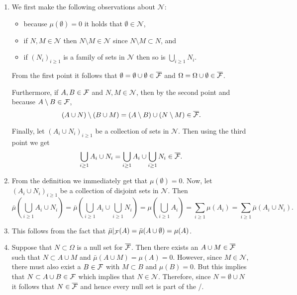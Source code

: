 \begin{enumerate}[label=(\alph*)]
\item We first make the following observations about $\mathcal{N}$:
\begin{itemize}
\item because $\mu(\emptyset) = 0$ it holds that $\emptyset \in \mathcal{N}$,
\item if $N, M \in \mathcal{N}$ then $N \setminus M \in \mathcal{N}$ since $N \setminus M \subset N$, and
\item if $(N_i)_{i \ge 1}$ is a family of sets in $\mathcal{N}$ then so is $\bigcup_{i \ge 1} N_i$.
\end{itemize}

From the first point it follows that $\emptyset = \emptyset \cup \emptyset \in \overline{\mathcal F}$ and $\Omega = \Omega \cup \emptyset \in \overline{\mathcal F}$.

Furthermore, if $A, B \in \mathcal F$ and $N, M \in \mathcal{N}$, then by the second point and because $A \setminus B \in \mathcal F$,
\[
	(A \cup N) \setminus (B \cup M) = (A \setminus B) \cup (N \setminus M) \in \overline{\mathcal F}.
\]

Finally, let $(A_i \cup N_i)_{i \ge 1}$ be a collection of sets in $\mathcal{N}$. Then using the third point we get
\[
	\bigcup_{i \ge 1} A_i \cup N_i = \bigcup_{i \ge 1} A_i \cup \bigcup_{i \ge 1} N_i \in \overline{\mathcal F}.
\]
\item From the definition we immediately get that $\mu(\emptyset) = 0$. Now, let $(A_i \cup N_i)_{i \ge 1}$ be a collection of disjoint sets in $\mathcal{N}$. Then
\[
	\bar{\mu}(\bigcup_{i \ge 1} A_i \cup N_i) = \bar{\mu}(\bigcup_{i \ge 1} A_i \cup \bigcup_{i \ge 1} N_i)
	= \mu(\bigcup_{i \ge 1} A_i) = \sum_{i \ge 1} \mu(A_i) = \sum_{i \ge 1} \bar{\mu}(A_i \cup N_i).
\]
\item This follows from the fact that $\bar{\mu}|_{\mathcal F}(A) = \bar{\mu}(A \cup \emptyset) = \mu(A)$.
\item Suppose that $N \subset \Omega$ is a null set for $\overline{\mathcal F}$. Then there exists an $A \cup M \in \overline{\mathcal F}$ such that $N \subset A \cup M$ and $\bar{\mu}(A \cup M) = \mu(A) = 0$. However, since $M \in \mathcal{N}$, there must also exist a $B \in \mathcal F$ with $M \subset B$ and $\mu(B) = 0$. But this implies that $N \subset A \cup B \in \mathcal F$ which implies that $N \in \mathcal{N}$. Therefore, since $N = \emptyset \cup N$ it follows that $N \in \overline{\mathcal F}$ and hence every null set is part of the \sigalg/.
\end{enumerate}